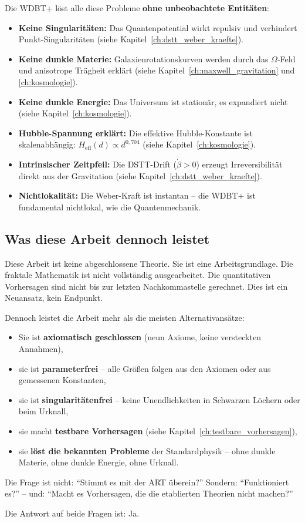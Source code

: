Die WDBT+ löst alle diese Probleme \textbf{ohne unbeobachtete Entitäten}:

\begin{itemize}
    \item \textbf{Keine Singularitäten:} Das Quantenpotential wirkt repulsiv und verhindert Punkt-Singularitäten (siehe Kapitel~\ref{ch:dstt_weber_kraefte}).
    \item \textbf{Keine dunkle Materie:} Galaxienrotationskurven werden durch das \( \Omega \)-Feld und anisotrope Trägheit erklärt (siehe Kapitel~\ref{ch:maxwell_gravitation} und \ref{ch:kosmologie}).
    \item \textbf{Keine dunkle Energie:} Das Universum ist stationär, es expandiert nicht (siehe Kapitel~\ref{ch:kosmologie}).
    \item \textbf{Hubble-Spannung erklärt:} Die effektive Hubble-Konstante ist skalenabhängig: \( H_{\text{eff}}(d) \propto d^{0,704} \) (siehe Kapitel~\ref{ch:kosmologie}).
    \item \textbf{Intrinsischer Zeitpfeil:} Die DSTT-Drift (\( \dot{\beta} > 0 \)) erzeugt Irreversibilität direkt aus der Gravitation (siehe Kapitel~\ref{ch:dstt_weber_kraefte}).
    \item \textbf{Nichtlokalität:} Die Weber-Kraft ist instantan – die WDBT+ ist fundamental nichtlokal, wie die Quantenmechanik.
\end{itemize}

\subsection*{Was diese Arbeit dennoch leistet}

Diese Arbeit ist keine abgeschlossene Theorie. Sie ist eine Arbeitsgrundlage. Die fraktale Mathematik ist nicht vollständig ausgearbeitet. Die quantitativen Vorhersagen sind nicht bis zur letzten Nachkommastelle gerechnet. Dies ist ein Neuansatz, kein Endpunkt.

Dennoch leistet die Arbeit mehr als die meisten Alternativansätze:

\begin{itemize}
    \item Sie ist \textbf{axiomatisch geschlossen} (neun Axiome, keine versteckten Annahmen),
    \item sie ist \textbf{parameterfrei} – alle Größen folgen aus den Axiomen oder aus gemessenen Konstanten,
    \item sie ist \textbf{singularitätenfrei} – keine Unendlichkeiten in Schwarzen Löchern oder beim Urknall,
    \item sie macht \textbf{testbare Vorhersagen} (siehe Kapitel~\ref{ch:testbare_vorhersagen}),
    \item sie \textbf{löst die bekannten Probleme} der Standardphysik – ohne dunkle Materie, ohne dunkle Energie, ohne Urknall.
\end{itemize}

Die Frage ist nicht: \enquote{Stimmt es mit der ART überein?} Sondern: \enquote{Funktioniert es?} – und: \enquote{Macht es Vorhersagen, die die etablierten Theorien nicht machen?}

Die Antwort auf beide Fragen ist: Ja.